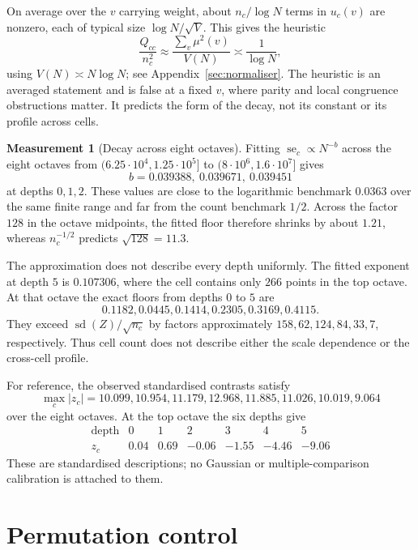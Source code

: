 \documentclass[11pt,a4paper]{article}
\theoremstyle{plain}
\theoremstyle{definition}
\newtheorem{measurement}[theorem]{Measurement}
\theoremstyle{remark}
\begin{document}
On average over the $v$ carrying weight, about $n_c/\log N$ terms in
$u_c(v)$ are nonzero, each of typical size $\log N/\sqrt V$.  This gives
the heuristic
\begin{equation}\label{eq:coherent}
 \frac{Q_{cc}}{n_c^2}
 \approx \frac{\sum_v\mu^2(v)}{V(N)}
 \asymp \frac1{\log N},
\end{equation}
using $V(N)\asymp N\log N$; see Appendix~\ref{sec:normaliser}.
The heuristic is an averaged statement and is false at a fixed $v$,
where parity and local congruence obstructions matter.  It predicts the
form of the decay, not its constant or its profile across cells.

\begin{measurement}[Decay across eight octaves]\label{meas:decay}
Fitting $\operatorname{se}_c\propto N^{-b}$ across the eight octaves
from $(6.25\cdot10^4,1.25\cdot10^5]$ to
$(8\cdot10^6,1.6\cdot10^7]$ gives
\[
 b=0.039388,\ 0.039671,\ 0.039451
\]
at depths $0,1,2$.  These values are close to the logarithmic benchmark
$0.0363$ over the same finite range and far from the count benchmark
$1/2$.  Across the factor $128$ in the octave midpoints, the fitted
floor therefore shrinks by about $1.21$, whereas $n_c^{-1/2}$ predicts
$\sqrt{128}=11.3$.

The approximation does not describe every depth uniformly.  The fitted
exponent at depth $5$ is $0.107306$, where the cell contains only $266$
points in the top octave.  At that octave the exact floors from depths
$0$ to $5$ are
\[
 0.1182, 0.0445, 0.1414, 0.2305, 0.3169, 0.4115.
\]
They exceed $\operatorname{sd}(Z)/\sqrt{n_c}$ by factors approximately
$158,62,124,84,33,7$, respectively.  Thus cell count does not describe
either the scale dependence or the cross-cell profile.
\end{measurement}

For reference, the observed standardised contrasts satisfy
\[
 \max_c|z_c|=
 10.099,10.954,11.179,12.968,11.885,11.026,10.019,9.064
\]
over the eight octaves.  At the top octave the six depths give
\[
\begin{array}{r|rrrrrr}
 \text{depth}&0&1&2&3&4&5\\\hline
 z_c&0.04&0.69&-0.06&-1.55&-4.46&-9.06
\end{array}
\]
These are standardised descriptions; no Gaussian or
multiple-comparison calibration is attached to them.

\section{Permutation control}\label{sec:permutation}
\end{document}
